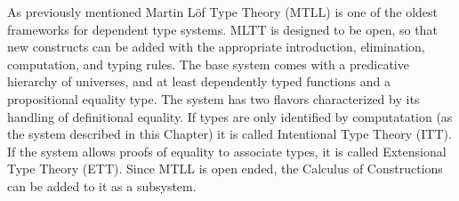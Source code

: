 As previously mentioned Martin L{\"o}f Type Theory (\ac{MTLL})\cite{Martin-Lof-1972} is one of the oldest frameworks for dependent type systems.
MLTT is designed to be open, so that new constructs can be added with the appropriate introduction, elimination, computation, and typing rules.
The base system comes with a predicative hierarchy of universes, and at least dependently typed functions and a propositional equality type.
The system has two flavors characterized by its handling of definitional equality.
If types are only identified by computatation (as the system described in this Chapter) it is called Intentional Type Theory (\ac{ITT}).
If the system allows proofs of equality to associate types, it is called Extensional Type Theory (\ac{ETT}).
Since \ac{MTLL} is open ended, the Calculus of Constructions can be added to it as a subsystem\cite{aspinall2004dependent,hofmann1997extensional}.



